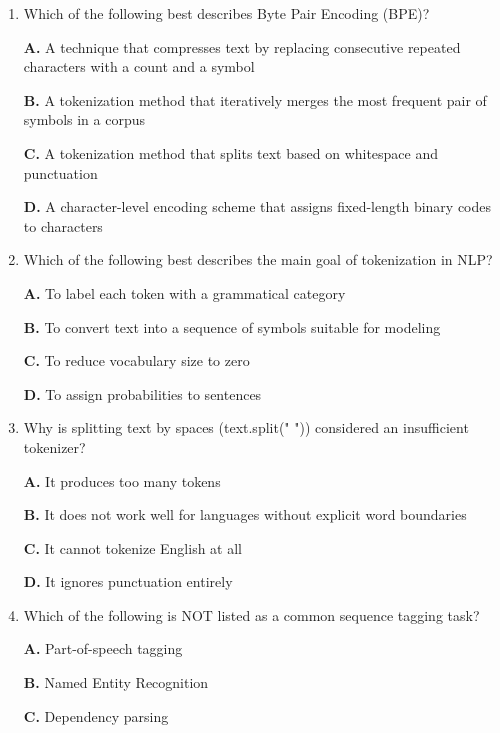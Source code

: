 \documentclass[11pt]{article}
\begin{document}
\begin{enumerate}[label=Q\arabic*., leftmargin=*]
\textbf{B.} A process that assigns grammatical roles like subject and object based on syntactic structure

\textbf{C.} A method that classifies named entities and links them to a knowledge base

\textbf{D.} A technique that labels words with their parts of speech and morphological features

\item Which of the following best describes Byte Pair Encoding (BPE)?

\textbf{A.} A technique that compresses text by replacing consecutive repeated characters with a count and a symbol

\textbf{B.} A tokenization method that iteratively merges the most frequent pair of symbols in a corpus

\textbf{C.} A tokenization method that splits text based on whitespace and punctuation

\textbf{D.} A character-level encoding scheme that assigns fixed-length binary codes to characters

\item Which of the following best describes the main goal of tokenization in NLP?

\textbf{A.} To label each token with a grammatical category

\textbf{B.} To convert text into a sequence of symbols suitable for modeling

\textbf{C.} To reduce vocabulary size to zero

\textbf{D.} To assign probabilities to sentences

\item Why is splitting text by spaces (text.split(" ")) considered an insufficient tokenizer?

\textbf{A.} It produces too many tokens

\textbf{B.} It does not work well for languages without explicit word boundaries

\textbf{C.} It cannot tokenize English at all

\textbf{D.} It ignores punctuation entirely

\item Which of the following is NOT listed as a common sequence tagging task?

\textbf{A.} Part-of-speech tagging

\textbf{B.} Named Entity Recognition

\textbf{C.} Dependency parsing


\end{enumerate}
\end{document}
